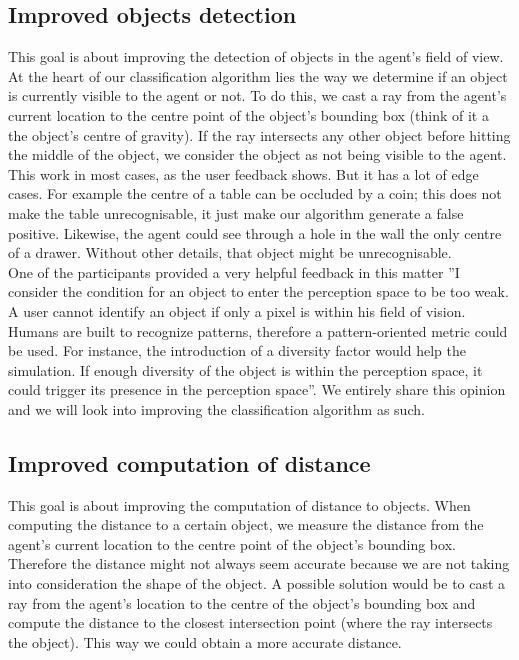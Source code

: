 \subsection{Improved objects detection} 
This goal is about improving the detection of objects in the agent's field of view. At the heart of our classification algorithm lies the way we determine if an object is currently visible to the agent or not. To do this, we cast a ray from the agent's current location to the centre point of the object's bounding box (think of it a the object's centre of gravity). If the ray intersects any other object before hitting the middle of the object, we consider the object as not being visible to the agent. This work in most cases, as the user feedback shows. But it has a lot of edge cases. For example the centre of a table can be occluded by a coin; this does not make the table unrecognisable, it just make our algorithm generate a false positive. Likewise, the agent could see through a hole in the wall the only centre of a drawer. Without other details, that object
might be unrecognisable.\\

One of the participants provided a very helpful feedback in this matter ''I consider the condition for an object to enter the perception space to be too weak. A user cannot identify an object if only a pixel is within his field of vision. Humans are built to recognize patterns, therefore a pattern-oriented metric could be used. For instance, the introduction of a diversity factor would help the simulation. If enough diversity of the object is within the perception space, it could trigger its presence in the perception space''. We entirely share this opinion and we will look into improving the classification algorithm as such.

\subsection{Improved computation of distance}
This goal is about improving the computation of distance to objects. When computing the distance to a certain object, we measure the distance from the agent's current location to the centre point of the object's bounding box. Therefore the distance might not always seem accurate because we are not taking into consideration the shape of the object. A possible solution would be to cast a ray from the agent's location to the centre of the object's bounding box and compute the distance to the closest intersection point (where the ray intersects the object). This way we could obtain a more accurate distance.


